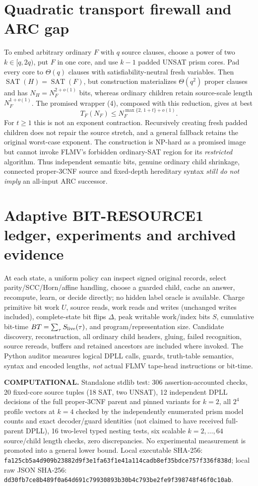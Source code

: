 \documentclass[11pt]{article}
\newcommand{\SAT}{\operatorname{SAT}}
\begin{document}
\section{Quadratic transport firewall and ARC gap}
To embed arbitrary ordinary \(F\) with \(q\) source clauses, choose a power
of two \(k\in[q,2q)\), put \(F\) in one core, and use \(k-1\) padded
UNSAT prism cores. Pad every core to \(\Theta(q)\) clauses with
satisfiability-neutral fresh variables. Then
\(\SAT(H)=\SAT(F)\), but construction materializes \(\Theta(q^2)\)
proper clauses and has \(N_H=N_F^{2+o(1)}\) bits, whereas ordinary
children retain source-scale length \(N_F^{1+o(1)}\).
The promised wrapper (4), composed with this reduction, gives at best
\[
T_F(N_F)\le N_F^{\max\{2,\,1+t\}+o(1)}.\tag{6}
\]
For \(t\ge1\) this is not an exponent contraction. Recursively creating
fresh padded children does not repair the source stretch, and a general
fallback retains the original worst-case exponent. The construction
is NP-hard as a promised image but cannot invoke FLMV's forbidden
ordinary-SAT region for its \emph{restricted} algorithm. Thus
independent semantic bits, genuine ordinary child shrinkage,
connected proper-3CNF source and fixed-depth hereditary syntax
\emph{still do not imply} an all-input ARC successor.

\section{Adaptive BIT-RESOURCE1 ledger, experiments and archived evidence}
At each state, a uniform policy can inspect signed original records,
select parity/SCC/Horn/affine handling, choose a guarded child,
cache an answer, recompute, learn, or decide directly; no hidden label
oracle is available. Charge primitive bit work \(U\), source reads,
work reads and writes (unchanged writes included), complete-state
bit flips \(\Delta\), peak writable work/index bits \(S\), cumulative
bit-time \(BT=\sum_\tau S_{\rm live}(\tau)\), and program/representation
size. Candidate discovery, reconstruction, all ordinary child headers,
gluing, failed recognition, source rereads, buffers and retained ancestors
are included where invoked. The Python auditor measures logical
DPLL calls, guards, truth-table semantics, syntax and encoded lengths,
\emph{not} actual FLMV tape-head instructions or bit-time.

\textbf{COMPUTATIONAL.} Standalone stdlib test: 306 assertion-accounted
checks, 20 fixed-core source tuples (18 SAT, two UNSAT), 12 independent
DPLL decisions of the full proper-3CNF parent and pinned variants for
\(k=2\), all \(2^4\) profile vectors at \(k=4\) checked by the
independently enumerated prism model counts and exact decoder/guard
identities (not claimed to have received full-parent DPLL),
16 two-level typed nesting tests, six scalable \(k=2,\ldots,64\)
source/child length checks, zero discrepancies. No experimental
measurement is promoted into a general lower bound.
Local executable SHA-256:
\texttt{fa125cb5a4d909b23882d9f3e1fa63f1e41a114cadb8ef35bdce757f336f838d};
local raw JSON SHA-256:
\texttt{dd30fb7ce8b489f0a64d691c79930893b30b4c793be2fe9f398748f46f0c10ab}.
\end{document}
